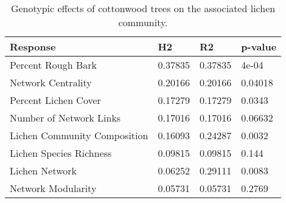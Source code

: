 \begin{table}[ht]
\centering
\begin{tabular}{llll}
  \hline
Response & H2 & R2 & p-value \\ 
  \hline
Percent Rough Bark & 0.37835 & 0.37835 & 4e-04 \\ 
  Network Centrality & 0.20166 & 0.20166 & 0.04018 \\ 
  Percent Lichen Cover & 0.17279 & 0.17279 & 0.0343 \\ 
  Number of Network Links & 0.17016 & 0.17016 & 0.06632 \\ 
  Lichen Community Composition & 0.16093 & 0.24287 & 0.0032 \\ 
  Lichen Species Richness & 0.09815 & 0.09815 & 0.144 \\ 
  Lichen Network & 0.06252 & 0.29111 & 0.0083 \\ 
  Network Modularity & 0.05731 & 0.05731 & 0.2769 \\ 
   \hline
\end{tabular}
\caption{Genotypic effects of cottonwood trees on the associated lichen community.} 
\label{tab:h2_table}
\end{table}
